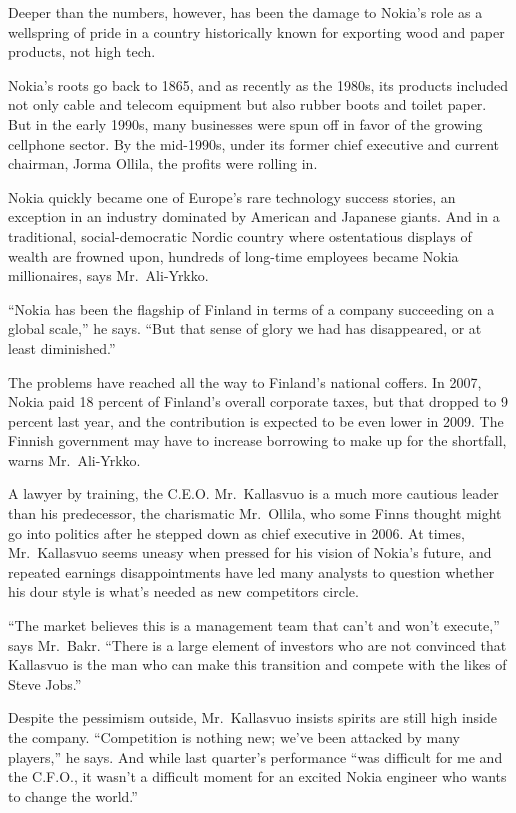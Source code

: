 ﻿\documentclass[12pt]{article}
\begin{document}
Deeper than the numbers, however, has been the damage to Nokia's role as a wellspring of pride in a
country historically known for exporting wood and paper products, not high tech.

Nokia's roots go back to 1865, and as recently as the 1980s, its products included not only cable
and telecom equipment but also rubber boots and toilet paper. But in the early 1990s, many
businesses were spun off in favor of the growing cellphone sector. By the mid-1990s, under its
former chief executive and current chairman, Jorma Ollila, the profits were rolling in.

Nokia quickly became one of Europe's rare technology success stories, an exception in an industry
dominated by American and Japanese giants. And in a traditional, social-democratic Nordic country
where ostentatious displays of wealth are frowned upon, hundreds of long-time employees became Nokia
millionaires, says Mr.~Ali-Yrkko.

``Nokia has been the flagship of Finland in terms of a company succeeding on a global scale,'' he
says. ``But that sense of glory we had has disappeared, or at least diminished.''

The problems have reached all the way to Finland's national coffers. In 2007, Nokia paid 18 percent
of Finland's overall corporate taxes, but that dropped to 9 percent last year, and the contribution
is expected to be even lower in 2009. The Finnish government may have to increase borrowing to make
up for the shortfall, warns Mr.~Ali-Yrkko.

A lawyer by training, the C.E.O. Mr.~Kallasvuo is a much more cautious leader than his predecessor,
the charismatic Mr.~Ollila, who some Finns thought might go into politics after he stepped down as
chief executive in 2006. At times, Mr.~Kallasvuo seems uneasy when pressed for his vision of Nokia's
future, and repeated earnings disappointments have led many analysts to question whether his dour
style is what's needed as new competitors circle.

``The market believes this is a management team that can't and won't execute,'' says Mr.~Bakr.
``There is a large element of investors who are not convinced that Kallasvuo is the man who can make
this transition and compete with the likes of Steve Jobs.''

Despite the pessimism outside, Mr.~Kallasvuo insists spirits are still high inside the company.
``Competition is nothing new; we've been attacked by many players,'' he says. And while last
quarter's performance ``was difficult for me and the C.F.O., it wasn't a difficult moment for an
excited Nokia engineer who wants to change the world.''
\end{document}
